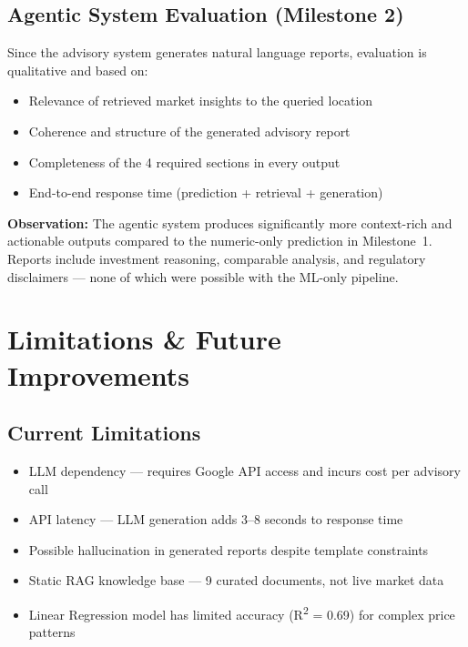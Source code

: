 \documentclass[11pt,a4paper]{article}
\begin{document}
\subsection{Agentic System Evaluation (Milestone 2)}

Since the advisory system generates natural language reports, evaluation is qualitative and based on:

\begin{itemize}
    \item Relevance of retrieved market insights to the queried location
    \item Coherence and structure of the generated advisory report
    \item Completeness of the 4 required sections in every output
    \item End-to-end response time (prediction + retrieval + generation)
\end{itemize}

\vspace{0.2em}
\textbf{Observation:} The agentic system produces significantly more context-rich and actionable outputs compared to the numeric-only prediction in Milestone~1. Reports include investment reasoning, comparable analysis, and regulatory disclaimers --- none of which were possible with the ML-only pipeline.


\newpage

\section{Limitations \& Future Improvements}

\subsection{Current Limitations}

\begin{itemize}
    \item LLM dependency --- requires Google API access and incurs cost per advisory call
    \item API latency --- LLM generation adds 3--8 seconds to response time
    \item Possible hallucination in generated reports despite template constraints
    \item Static RAG knowledge base --- 9 curated documents, not live market data
    \item Linear Regression model has limited accuracy (R\textsuperscript{2} = 0.69) for complex price patterns
\end{itemize}
\end{document}
